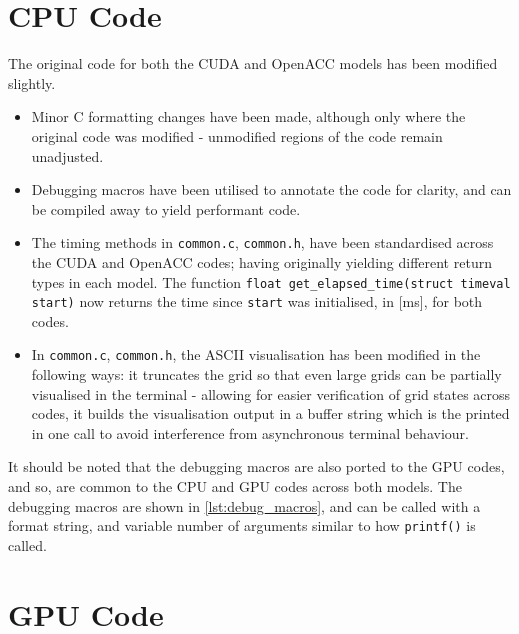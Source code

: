 \documentclass{article}
\newcommand{\lilf}[1]{\lstinline[style=ff]{#1}}
\begin{document}
\section{CPU Code}
\label{sec:cpu-code}

The original code for both the CUDA and OpenACC models has been modified
slightly.
\begin{itemize}
\item
  Minor C formatting changes have been made, although only where the original
  code was modified - unmodified regions of the code remain unadjusted.

\item
  Debugging macros have been utilised to annotate the code for clarity, and can
  be compiled away to yield performant code.

\item
  The timing methods in \lilf{common.c}, \lilf{common.h}, have been
  standardised across the CUDA and OpenACC codes; having originally yielding
  different return types in each model.
  The function \lstinline{float get_elapsed_time(struct timeval start)} now
  returns the time since \lstinline{start} was initialised, in
  [\si{\milli\second}], for both codes.

\item
  In \lilf{common.c}, \lilf{common.h}, the ASCII visualisation has been modified
  in the following ways: it truncates the grid so that even large grids can be
  partially visualised in the terminal - allowing for easier verification of
  grid states across codes, it builds the visualisation output in a buffer
  string which is the printed in one call to avoid interference from
  asynchronous terminal behaviour.

\end{itemize}

It should be noted that the debugging macros are also ported to the GPU codes,
and so, are common to the CPU and GPU codes across both models.
The debugging macros are shown in \autoref{lst:debug_macros}, and can be called
with a format string, and variable number of arguments similar to how
\lstinline{printf()} is called.



\section{GPU Code}
\label{sec:Gpu-code}
\end{document}
